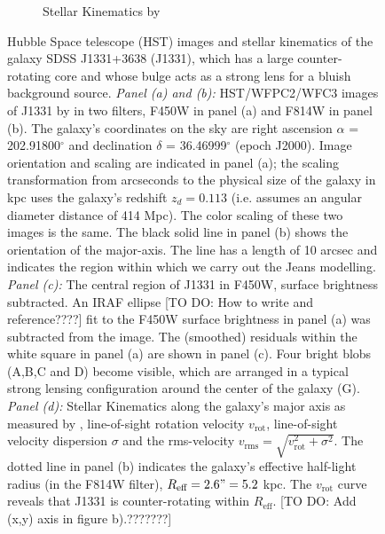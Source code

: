 \begin{figure}
\begin{subfigure}{.5\textwidth}
  \caption{Stellar Kinematics by \citet{SWELLSV}}
  \label{fig:kinematics}
\end{subfigure}
\caption{Hubble Space telescope (HST) images and stellar kinematics of the galaxy SDSS J1331+3638 (J1331), which has a large counter-rotating core and whose bulge acts as a strong lens for a bluish background source. \emph{Panel (a) and (b):} HST/WFPC2/WFC3 images of J1331 by \citet{SWELLSI} in two filters, F450W in panel (a) and F814W in panel (b). The galaxy's coordinates on the sky are right ascension $\alpha$ = 202.91800$^\circ$ and declination $\delta$ = 36.46999$^\circ$ (epoch J2000). Image orientation and scaling are indicated in panel (a); the scaling transformation from arcseconds to the physical size of the galaxy in kpc uses the galaxy's redshift $z_d = 0.113$ \citep{SWELLSIII} (i.e. assumes an angular diameter distance of 414 Mpc). The color scaling of these two images is the same. The black solid line in panel (b) shows the orientation of the major-axis. The line has a length of 10 arcsec and indicates the region within which we carry out the Jeans modelling. \emph{Panel (c):} The central region of J1331 in F450W, surface brightness subtracted. An IRAF ellipse [TO DO: How to write and reference????] fit to the F450W surface brightness in panel (a) was subtracted from the image. The (smoothed) residuals within the white square in panel (a) are shown in panel (c). Four bright blobs (A,B,C and D) become visible, which are arranged in a typical strong lensing configuration around the center of the galaxy (G). \emph{Panel (d):} Stellar Kinematics along the galaxy's major axis as measured by \citet{SWELLSV}, line-of-sight rotation velocity $v_\text{rot}$, line-of-sight velocity dispersion $\sigma$ and the rms-velocity $v_\text{rms} = \sqrt{v_\text{rot}^2 + \sigma^2}$. The dotted line in panel (b) indicates the galaxy's effective half-light radius (in the F814W filter), $R_\text{eff} = 2.6" = 5.2$ kpc. The $v_\text{rot}$ curve reveals that J1331 is counter-rotating within $R_\text{eff}$. [TO DO: Add (x,y) axis in figure b).???????]}
\label{fig:specialJ1331}
\end{figure}
